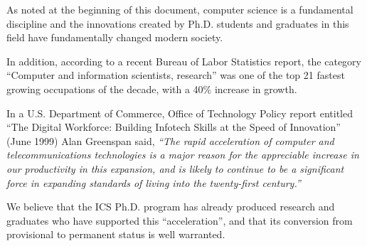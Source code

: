 \documentclass[12pt]{article}
\begin{document}
As noted at the beginning of this document, computer science is a
fundamental discipline and the innovations created by Ph.D. students and
graduates in this field have fundamentally changed modern society. 

In addition, according to a recent Bureau of Labor Statistics report, the
category ``Computer and information scientists, research'' was one of the
top 21 fastest growing occupations of the decade, with a 40\% increase in
growth. 

In a U.S. Department of Commerce, Office of Technology Policy report
entitled “The Digital Workforce: Building Infotech Skills at the Speed of
Innovation” (June 1999) Alan Greenspan said, {\em ``The rapid acceleration of
computer and telecommunications technologies is a major reason for the
appreciable increase in our productivity in this expansion, and is likely
to continue to be a significant force in expanding standards of living into
the twenty-first century.”}  

We believe that the ICS Ph.D. program has already produced research and
graduates who have supported this ``acceleration'', and that its conversion
from provisional to permanent status is well warranted.
\end{document}
